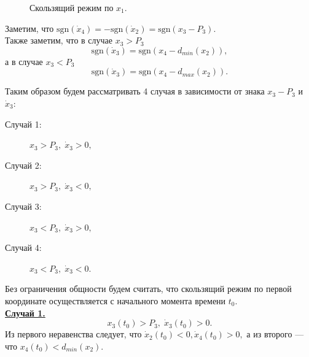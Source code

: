\documentclass[11pt]{article}
\theoremstyle{definition}
\begin{document}
\begin{figure}[h]
\caption{Скользящий режим по $x_1$.}
\end{figure}

Заметим, что $\text{sgn}(\dot x_4) = -\text{sgn}(\dot x_2) = \text{sgn}(x_3 - P_3).$ \\
Также заметим, что в случае $x_3 > P_3$ $$\text{sgn}(\dot x_3) =  \text{sgn}(x_4 - d_{min}(x_2)),$$ а в случае $x_3 < P_3$ $$\text{sgn}(\dot x_3) = \text{sgn}(x_4 -d_{max}(x_2)).$$

Таким образом будем рассматривать 4 случая в зависимости от знака $x_3 - P_3$ и $\dot x_3:$


\begin{description}
	\item[Случай 1:] $x_3 > P_3, \; \dot x_3 > 0,$
	\item[Случай 2:] $x_3 > P_3, \; \dot x_3 < 0,$
	\item[Случай 3:] $x_3 < P_3, \; \dot x_3 > 0,$
	\item[Случай 4:] $x_3 < P_3, \; \dot x_3 < 0.$
\end{description}

Без ограничения общности будем считать, что скользящий режим по первой координате осуществляется с начального момента времени $t_0$.\\

\underline {\bf Случай 1.} 
$$x_3(t_0) > P_3, \; \dot x_3(t_0) > 0.$$
Из первого неравенства следует, что $\dot x_2(t_0) < 0, \dot x_4(t_0) > 0,$ а из второго --- что $x_4(t_0) < d_{min}(x_2).$
\end{document}
